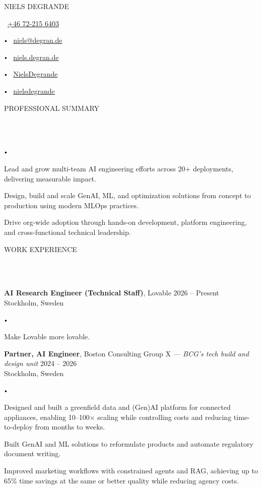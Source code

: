 \documentclass{article}
\newcommand{\contact}[2]{
    \begin{center}
    {\LARGE \uppercase {#1}} \\
    \vspace{8pt}
    #2
    \end{center}
}
\newcommand{\header}[1]{
    {
        \hspace*{-4pt}
        \vspace*{8pt}
        \uppercase{#1}
    }
    \vspace*{-4pt} 
    \lineunder
    \vspace*{8pt}
}
\newcommand{\lineunder}{
    \vspace*{-8pt} \\ 
    \hspace*{-4pt} 
    \hrulefill \\
}
\newcommand{\experience}[5]{
    \vspace*{2pt}
    \textbf{#1}, #2 \hfill #3 \\ 
    #4 \\
    #5
    \vspace*{2pt}
}
\newcommand{\bigdot}{
    $\vcenter{\hbox{\tiny$\bullet$}}$\hspace*{2pt}
}
\newcommand{\spacedbullet}{
    $\vcenter{\hbox{\tiny$\bullet$}}$\hspace*{-2pt}
}
\newenvironment{bulletlist}{
    \begin{list}
        {\spacedbullet}{\setlength\leftmargin{10pt} 
        \topsep 0pt \itemsep -2pt}}{\vspace*{4pt}
    \end{list}
}
\begin{document}
\small

\vspace*{-32pt}

\contact{Niels Degrande}
{
    \faPhone\ \href{tel:+46722156403}{+46 72-215 6403}
    \bigdot \faEnvelope\ \href{mailto:niels@degran.de}{niels@degran.de}
    \bigdot \faGlobe\ \href{https://niels.degran.de}{niels.degran.de}
    \bigdot \faGithub\ \href{https://github.com/NielsDegrande}{NielsDegrande}
    \bigdot \faLinkedin\ \href{https://linkedin.com/in/nielsdegrande}{nielsdegrande}
}

\vspace{16pt}

\header{Professional Summary}
\begin{bulletlist}
    \item Lead and grow multi-team AI engineering efforts across 20+ deployments, delivering measurable impact.
    \item Design, build and scale GenAI, ML, and optimization solutions from concept to production using modern MLOps practices.
    \item Drive org-wide adoption through hands-on development, platform engineering, and cross-functional technical leadership.
\end{bulletlist}

\vspace*{4pt}

\header{Work Experience}
\experience{AI Research Engineer (Technical Staff)}{Lovable}{2026 -- Present}{Stockholm, Sweden}
{
    \begin{bulletlist}
        \item Make Lovable more lovable.
    \end{bulletlist}
}

\experience{Partner, AI Engineer}{Boston Consulting Group X \textit{— BCG's tech build and design unit}}{2024 -- 2026}{Stockholm, Sweden}
{
    \begin{bulletlist}
        \item Designed and built a greenfield data and (Gen)AI platform for connected appliances, enabling 10--100$\times$ scaling while controlling costs and reducing time-to-deploy from months to weeks.
        \item Built GenAI and ML solutions to reformulate products and automate regulatory document writing.
        \item Improved marketing workflows with constrained agents and RAG, achieving up to 65\% time savings at the same or better quality while reducing agency costs.
    \end{bulletlist}
}
\end{document}
